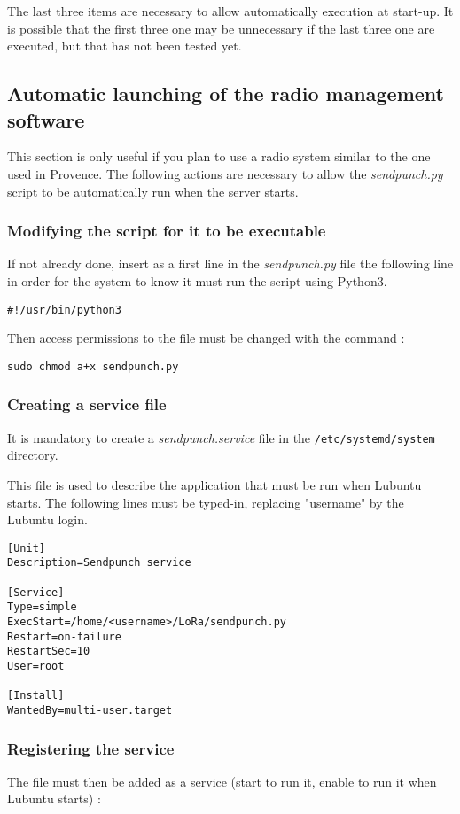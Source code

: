 \documentclass[a4paper]{ffco-rapport}
\begin{document}
			The last three items are necessary to allow automatically execution at start-up. It is possible that the first three one may be unnecessary if the last three one are executed, but that has not been tested yet.

	\subsection{Automatic launching of the radio management software}
		This section is only useful if you plan to use a radio system similar to the one used in Provence. The following actions are necessary to allow the \emph{sendpunch.py} script to be automatically run when the server starts.
		
		\subsubsection{Modifying the script for it to be executable}
			If not already done, insert as a first line in the \emph{sendpunch.py} file the following line in order for the system to know it must run the script using Python3.
			
			\verb|#!/usr/bin/python3|
			
			Then access permissions to the file must be changed with the command :
			
			\verb|sudo chmod a+x sendpunch.py|
		
		\subsubsection{Creating a service file}
			It is mandatory to create a \emph{sendpunch.service} file in the \texttt{/etc/systemd/system} directory.

			This file is used to describe the application that must be run when Lubuntu starts. The following lines must be typed-in, replacing "username" by the Lubuntu login.
			
			\begin{verbatim}
[Unit]
Description=Sendpunch service

[Service]
Type=simple
ExecStart=/home/<username>/LoRa/sendpunch.py
Restart=on-failure
RestartSec=10
User=root

[Install]
WantedBy=multi-user.target			
			\end{verbatim}

		\subsubsection{Registering the service}
			The file must then be added as a service (start to run it, enable to run it when Lubuntu starts) :
			
\end{document}
